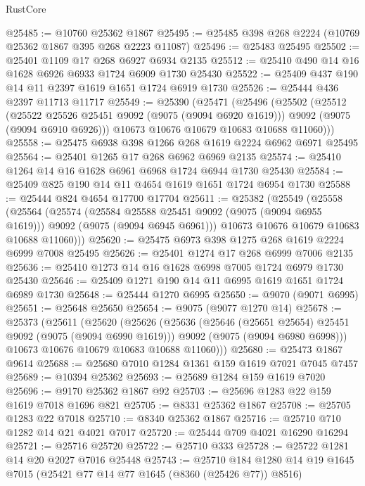 \begin{lexlean}{RustCore}
\begin{coremodule}
@25485 := @10760 @25362 @1867
@25495 := @25485 @398 @268 @2224 (@10769 @25362 @1867 @395 @268 @2223 @11087)
@25496 := @25483 @25495
@25502 := @25401 @1109 @17 @268 @6927 @6934 @2135
@25512 := @25410 @490 @14 @16 @1628 @6926 @6933 @1724 @6909 @1730 @25430
@25522 := @25409 @437 @190 @14 @11 @2397 @1619 @1651 @1724 @6919 @1730
@25526 := @25444 @436 @2397 @11713 @11717
@25549 := @25390
    (@25471
      (@25496
        (@25502
          (@25512
            (@25522 @25526 @25451 @9092 (@9075 (@9094 @6920 @1619)))
            @9092
            (@9075 (@9094 @6910 @6926)))
          @10673
          @10676
          @10679
          @10683
          @10688
          @11060)))
@25558 := @25475 @6938 @398 @1266 @268 @1619 @2224 @6962 @6971 @25495
@25564 := @25401 @1265 @17 @268 @6962 @6969 @2135
@25574 := @25410 @1264 @14 @16 @1628 @6961 @6968 @1724 @6944 @1730 @25430
@25584 := @25409 @825 @190 @14 @11 @4654 @1619 @1651 @1724 @6954 @1730
@25588 := @25444 @824 @4654 @17700 @17704
@25611 := @25382
    (@25549
      (@25558
        (@25564
          (@25574
            (@25584 @25588 @25451 @9092 (@9075 (@9094 @6955 @1619)))
            @9092
            (@9075 (@9094 @6945 @6961)))
          @10673
          @10676
          @10679
          @10683
          @10688
          @11060)))
@25620 := @25475 @6973 @398 @1275 @268 @1619 @2224 @6999 @7008 @25495
@25626 := @25401 @1274 @17 @268 @6999 @7006 @2135
@25636 := @25410 @1273 @14 @16 @1628 @6998 @7005 @1724 @6979 @1730 @25430
@25646 := @25409 @1271 @190 @14 @11 @6995 @1619 @1651 @1724 @6989 @1730
@25648 := @25444 @1270 @6995
@25650 := @9070 (@9071 @6995)
@25651 := @25648 @25650
@25654 := @9075 (@9077 @1270 @14)
@25678 := @25373
    (@25611
      (@25620
        (@25626
          (@25636
            (@25646 (@25651 @25654) @25451 @9092 (@9075 (@9094 @6990 @1619)))
            @9092
            (@9075 (@9094 @6980 @6998)))
          @10673
          @10676
          @10679
          @10683
          @10688
          @11060)))
@25680 := @25473 @1867 @9614
@25688 := @25680 @7010 @1284 @1361 @159 @1619 @7021 @7045 @7457
@25689 := @10394 @25362
@25693 := @25689 @1284 @159 @1619 @7020
@25696 := @9170 @25362 @1867 @92
@25703 := @25696 @1283 @22 @159 @1619 @7018 @1696 @821
@25705 := @8331 @25362 @1867
@25708 := @25705 @1283 @22 @7018
@25710 := @8340 @25362 @1867
@25716 := @25710 @710 @1282 @14 @21 @4021 @7017
@25720 := @25444 @709 @4021 @16290 @16294
@25721 := @25716 @25720
@25722 := @25710 @333
@25728 := @25722 @1281 @14 @20 @2027 @7016 @25448
@25743 := @25710
    @184
    @1280
    @14
    @19
    @1645
    @7015
    (@25421 @77 @14 @77 @1645 (@8360 (@25426 @77)) @8516)

\end{coremodule}
\end{lexlean}
